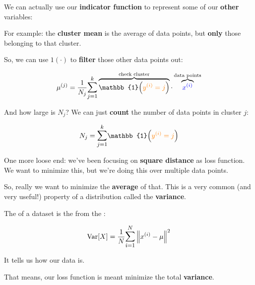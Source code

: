         We can actually use our \textbf{indicator function} to represent some of our \textbf{other} variables:
        
        For example: the \textbf{cluster mean} is the average of data points, but \textbf{only} those belonging to that cluster. 
        
        So, we can use $1(\cdot)$ to \textbf{filter} those other data points out:
        
        \begin{equation}
            \ex{\mu}{j} = \frac{1}{N_j} 
            \mathlarger{\sum_{j=1}^k} 
                \overbrace{
                    \mathbb{1} \Big( \org{\eyi = j} \Big)
                }^{ \text{check cluster} }
                \cdot
                \overbrace{
                    \blu{\exi}
                }^{ \text{data points} }
        \end{equation}
        
        And how large is $N_j$? We can just \textbf{count} the number of data points in cluster $j$:
        
        \begin{equation}
            N_j = 
            \mathlarger{\sum_{j=1}^k} 
                \mathbb{1} \Big( \org{\eyi = j} \Big)
        \end{equation}
        
        One more loose end: we've been focusing on \textbf{square distance} as loss function. We want to minimize this, but we're doing this over multiple data points.
        
        So, really we want to minimize the \textbf{average} of that. This is a very common (and very useful!) property of a distribution called the \textbf{variance}.\\
        
        \begin{definition}
            The  of a dataset is the  from the :
            
            \begin{equation*}
                \operatorname{Var}[X] = \frac{1}{N} 
                \mathlarger{\sum_{i=1}^{N}} \norm{\ex{x}{i} - \mu}^2
            \end{equation*}

            It tells us how  our data is.
        \end{definition}
        
        That means, our loss function is meant minimize the total \textbf{variance}.
            
